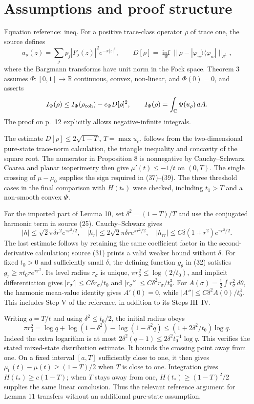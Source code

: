 \documentclass[10pt]{article}
\begin{document}
\section*{Assumptions and proof structure}
Equation reference: ineq. For a positive trace-class operator \(\rho\) of trace one, the source defines \[u_\rho(z)=\sum_jp_j|F_j(z)|^2e^{-\pi|z|^2},\qquad
 D[\rho]=\inf_w\|\rho-|\varphi_w\rangle\langle\varphi_w|\|_{\mathcal S^1},\] where the Bargmann transforms have unit norm in the Fock space. Theorem 3 assumes \(\Phi:[0,1]\to\mathbb R\) continuous, convex, non-linear, and \(\Phi(0)=0\), and asserts \[
 I_\Phi(\rho)\leq I_\Phi(\rho_{\rm coh})-c_\Phi D[\rho]^2,\qquad
 I_\Phi(\rho)=\int_{\mathbb C}\Phi(u_\rho)\,dA.\] The proof on p. 12 explicitly allows negative-infinite integrals.\par
The estimate \(D[\rho]\leq2\sqrt{1-T}\), \(T=\max u_\rho\), follows from the two-dimensional pure-state trace-norm calculation, the triangle inequality and concavity of the square root. The numerator in Proposition 8 is nonnegative by Cauchy–Schwarz. Coarea and planar isoperimetry then give \(\mu'(t)\leq-1/t\) on \((0,T)\). The single crossing of \(\mu-\mu_0\) supplies the sign required in (37)–(39). The three threshold cases in the final comparison with \(H(t_*)\) were checked, including \(t_1>T\) and a non-smooth convex \(\Phi\).\par
For the imported part of Lemma 10, set \(\delta^2=(1-T)/T\) and use the conjugated harmonic term in source (25). Cauchy–Schwarz gives \[|h|\leq\sqrt2\pi\delta r^2e^{\pi r^2/2},\quad
 |h_r|\leq2\sqrt2\pi\delta r e^{\pi r^2/2},\quad
 |h_{rr}|\leq C\delta(1+r^2)e^{\pi r^2/2}.\] The last estimate follows by retaining the same coefficient factor in the second-derivative calculation; source (31) prints a valid weaker bound without \(\delta\). For fixed \(t_0>0\) and sufficiently small \(\delta\), the defining function \(g_\theta\) in (32) satisfies \(g_r\geq\pi t_0 r e^{\pi r^2}\). Its level radius \(r_\sigma\) is unique, \(\pi r_\sigma^2\leq\log(2/t_0)\), and implicit differentiation gives \(|r_\sigma'|\leq C\delta r_\sigma/t_0\) and \(|r_\sigma''|\leq C\delta^2r_\sigma/t_0^3\). For \(A(\sigma)=\tfrac12\int r_\sigma^2\,d\theta\), the harmonic mean-value identity gives \(A'(0)=0\), while \(|A''|\leq C\delta^2A(0)/t_0^3\). This includes Step V of the reference, in addition to its Steps III–IV.\par
Writing \(q=T/t\) and using \(\delta^2\leq t_0/2\), the initial radius obeys \[\pi r_0^2=\log q+\log(1-\delta^2)-\log(1-\delta^2q)
 \leq(1+2\delta^2/t_0)\log q .\] Indeed the extra logarithm is at most \(2\delta^2(q-1)\leq2\delta^2t_0^{-1}\log q\). This verifies the stated mixed-state distribution estimate. It bounds the crossing point away from one. On a fixed interval \([a,T]\) sufficiently close to one, it then gives \(\mu_0(t)-\mu(t)\geq(1-T)/2\) when \(T\) is close to one. Integration gives \(H(t_*)\geq c(1-T)\); when \(T\) stays away from one, \(H(t_*)\geq(1-T)^2/2\) supplies the same linear conclusion. Thus the relevant reference argument for Lemma 11 transfers without an additional pure-state assumption.\par
\end{document}
